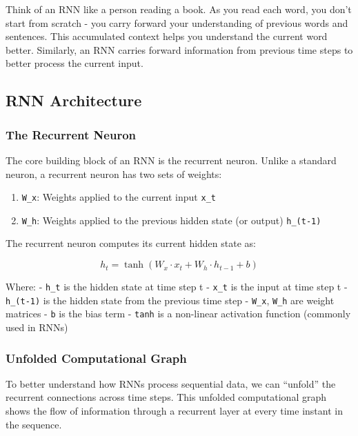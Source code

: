 \documentclass[
  letterpaper,
  DIV=11,
  numbers=noendperiod]{scrreprt}
\providecommand{\tightlist}{%
  \setlength{\itemsep}{0pt}\setlength{\parskip}{0pt}}\usepackage{longtable,booktabs,array}
\begin{document}
Think of an RNN like a person reading a book. As you read each word, you
don't start from scratch - you carry forward your understanding of
previous words and sentences. This accumulated context helps you
understand the current word better. Similarly, an RNN carries forward
information from previous time steps to better process the current
input.

\subsection{RNN Architecture}\label{rnn-architecture}

\subsubsection{The Recurrent Neuron}\label{the-recurrent-neuron}

The core building block of an RNN is the recurrent neuron. Unlike a
standard neuron, a recurrent neuron has two sets of weights:

\begin{enumerate}
\def\labelenumi{\arabic{enumi}.}
\tightlist
\item
  \texttt{W\_x}: Weights applied to the current input \texttt{x\_t}
\item
  \texttt{W\_h}: Weights applied to the previous hidden state (or
  output) \texttt{h\_(t-1)}
\end{enumerate}

The recurrent neuron computes its current hidden state as:

\[h_t = \tanh(W_x \cdot x_t + W_h \cdot h_{t-1} + b)\]

Where: - \texttt{h\_t} is the hidden state at time step t -
\texttt{x\_t} is the input at time step t - \texttt{h\_(t-1)} is the
hidden state from the previous time step - \texttt{W\_x}, \texttt{W\_h}
are weight matrices - \texttt{b} is the bias term - \texttt{tanh} is a
non-linear activation function (commonly used in RNNs)

\subsubsection{Unfolded Computational
Graph}\label{unfolded-computational-graph}

To better understand how RNNs process sequential data, we can ``unfold''
the recurrent connections across time steps. This unfolded computational
graph shows the flow of information through a recurrent layer at every
time instant in the sequence.
\end{document}
